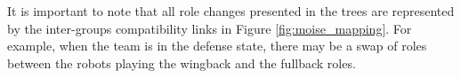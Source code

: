 It is important to note that all role changes presented in the trees are represented by the inter-groups compatibility links in Figure \ref{fig:moise_mapping}. For example, when the team is in the defense state, there may be a swap of roles between the robots playing the wingback and the fullback roles.
